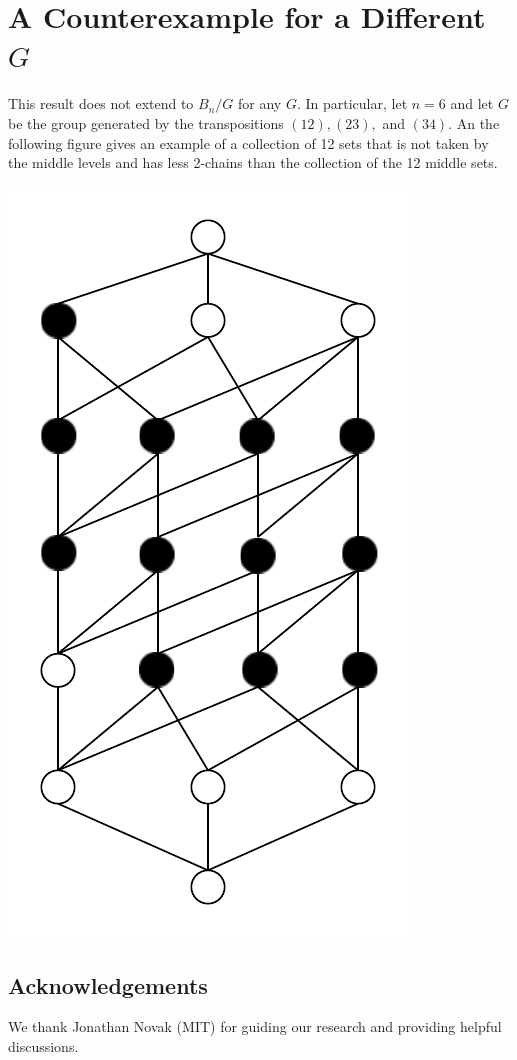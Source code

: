 \documentclass[12pt]{article}
\theoremstyle{plain}
\theoremstyle{definition}
\theoremstyle{remark}
\begin{document}
\section{A Counterexample for a Different $G$}

This result does not extend to $B_n / G$ for any $G$. In particular, let $n = 6$ and let $G$ be the group generated by the transpositions $(12), (23),$ and $(34)$. An the following figure gives an example of a collection of 12 sets that is not taken by the middle levels and has less 2-chains than the collection of the 12 middle sets.
\begin{center}
\includegraphics[scale=0.7]{counterexamplegraph.pdf}
\end{center}
\subsection*{Acknowledgements}
We thank Jonathan Novak (MIT) for guiding our research and providing helpful discussions.

%  
%  

\begin{thebibliography}{10}

\end{thebibliography}
\end{document}
